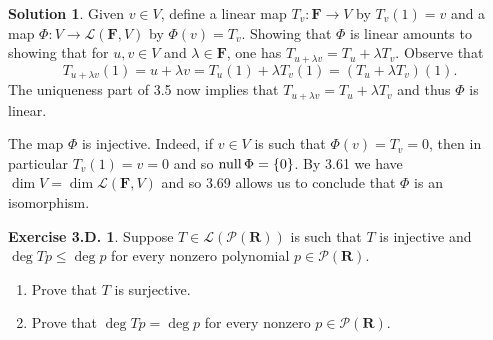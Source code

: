 \documentclass[12pt]{article}
\theoremstyle{definition}
\theoremstyle{exercise}
\newtheorem{exercise}{Exercise 3.D.}
\theoremstyle{solution}
\newtheorem*{solution}{Solution}
\newcommand{\poly}{\mathcal{P}}
\newcommand{\lmap}{\mathcal{L}}
\newcommand{\Null}{\text{null\,}}
\newcommand{\R}{\mathbf{R}}
\newcommand{\F}{\mathbf{F}}
\begin{document}
\begin{solution}
    Given \( v \in V \), define a linear map \( T_v : \F \to V \) by \( T_v(1) = v \) and a map \( \Phi : V \to \lmap(\F, V) \) by \( \Phi(v) = T_v \). Showing that \( \Phi \) is linear amounts to showing that for \( u, v \in V \) and \( \lambda \in \F \), one has \( T_{u + \lambda v} = T_u + \lambda T_v \). Observe that
    \[
        T_{u + \lambda v}(1) = u + \lambda v = T_u(1) + \lambda T_v(1) = (T_u + \lambda T_v)(1).
    \]
    The uniqueness part of 3.5 now implies that \( T_{u + \lambda v} = T_u + \lambda T_v \) and thus \( \Phi \) is linear.

    The map \( \Phi \) is injective. Indeed, if \( v \in V \) is such that \( \Phi(v) = T_v = 0 \), then in particular \( T_v(1) = v = 0 \) and so \( \Null \Phi = \{ 0 \} \). By 3.61 we have \( \dim V = \dim \lmap(\F, V) \) and so 3.69 allows us to conclude that \( \Phi \) is an isomorphism.
\end{solution}

\begin{exercise}
\label{ex:19}
    Suppose \( T \in \lmap(\poly(\R)) \) is such that \( T \) is injective and \( \deg Tp \leq \deg p \) for every nonzero polynomial \( p \in \poly(\R) \).
    \begin{enumerate}
        \item Prove that \( T \) is surjective.
        
        \item Prove that \( \deg Tp = \deg p \) for every nonzero \( p \in \poly(\R) \).
    \end{enumerate}
\end{exercise}
\end{document}
